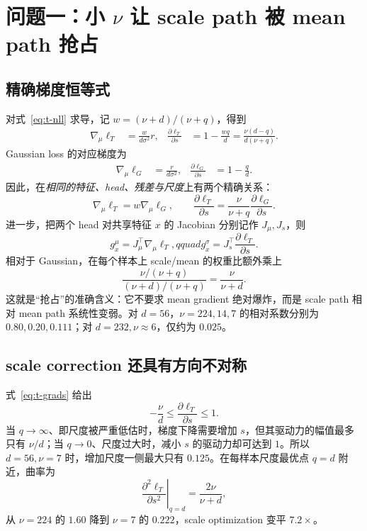 \documentclass[10pt]{article}
\begin{document}
\section{问题一：小 $\nu$ 让 scale path 被 mean path 抢占}

\subsection{精确梯度恒等式}

对式~\eqref{eq:t-nll} 求导，记 $w=(\nu+d)/(\nu+q)$，得到
\begin{align}
 \nabla_\mu \ell_T
 &=\frac{w}{d\sigma^2}r,
 &
 \frac{\partial\ell_T}{\partial s}
 &=1-\frac{wq}{d}
 =\frac{\nu(d-q)}{d(\nu+q)}. 
 \label{eq:t-grads}
\end{align}
Gaussian loss 的对应梯度为
\begin{align}
 \nabla_\mu \ell_G&=\frac{r}{d\sigma^2},
 &
 \frac{\partial\ell_G}{\partial s}&=1-\frac{q}{d}.
 \label{eq:g-grads}
\end{align}
因此，在\emph{相同的特征、head、残差与尺度}上有两个精确关系：
\begin{equation}
 \nabla_\mu\ell_T=w\nabla_\mu\ell_G,
 \qquad
 \frac{\partial\ell_T}{\partial s}
 =\frac{\nu}{\nu+q}\frac{\partial\ell_G}{\partial s}.
 \label{eq:gradient-identities}
\end{equation}
进一步，把两个 head 对共享特征 $x$ 的 Jacobian 分别记作 $J_\mu,J_s$，则
\begin{equation}
 g_x^\mu=J_\mu^\top\nabla_\mu\ell_T,qquad
 g_x^\sigma=J_s^\top\frac{\partial\ell_T}{\partial s}.
\end{equation}
相对于 Gaussian，在每个样本上 scale/mean 的权重比额外乘上
\begin{equation}
 \frac{\nu/(\nu+q)}{(\nu+d)/(\nu+q)}
 =\boxed{\frac{\nu}{\nu+d}}.
 \label{eq:relative-suppression}
\end{equation}
这就是“抢占”的准确含义：它不要求 mean gradient 绝对爆炸，而是 scale path 相对 mean path 系统性变弱。对 $d=56$，$\nu=224,14,7$ 的相对系数分别为 $0.80,0.20,0.111$；对 $d=232,\nu\approx6$，仅约为 $0.025$。

\subsection{scale correction 还具有方向不对称}

式~\eqref{eq:t-grads} 给出
\begin{equation}
 -\frac{\nu}{d}\leq \frac{\partial\ell_T}{\partial s}\leq1.
 \label{eq:scale-cap}
\end{equation}
当 $q\rightarrow\infty$、即尺度被严重低估时，梯度下降需要增加 $s$，但其驱动力的幅值最多只有 $\nu/d$；当 $q\rightarrow0$、尺度过大时，减小 $s$ 的驱动力却可达到 $1$。所以 $d=56,\nu=7$ 时，增加尺度一侧最大只有 $0.125$。在每样本尺度最优点 $q=d$ 附近，曲率为
\begin{equation}
 \left.\frac{\partial^2\ell_T}{\partial s^2}\right|_{q=d}
 =\frac{2\nu}{\nu+d},
 \label{eq:scale-curvature}
\end{equation}
从 $\nu=224$ 的 $1.60$ 降到 $\nu=7$ 的 $0.222$，scale optimization 变平 $7.2\times$。
\end{document}
